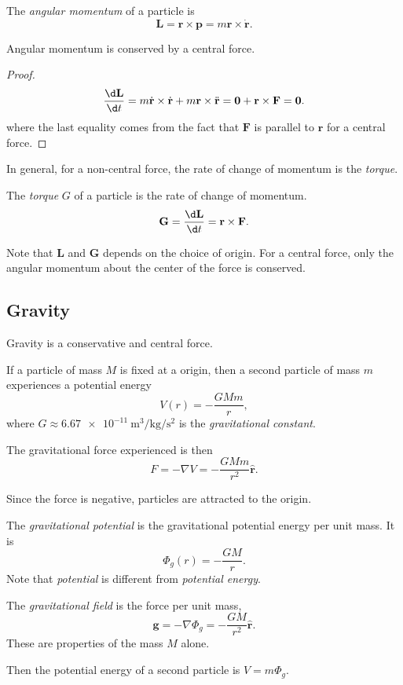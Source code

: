 \documentclass[a4paper]{article}
\begin{document}
\begin{defi}
  The \emph{angular momentum} of a particle is
  \[
    \mathbf{L} = \mathbf{r}\times \mathbf{p} = m\mathbf{r}\times \dot{\mathbf{r}}.
  \]
\end{defi}

\begin{prop}
  Angular momentum is conserved by a central force.
\end{prop}

\begin{proof}
  \[
    \frac{\d \mathbf{L}}{\d t} = m\dot{\mathbf{r}} \times \dot{\mathbf{r}} + m\mathbf{r}\times \ddot{\mathbf{r}} = \mathbf{0} + \mathbf{r}\times \mathbf{F} = \mathbf{0}.
  \]
  where the last equality comes from the fact that $\mathbf{F}$ is parallel to $\mathbf{r}$ for a central force.
\end{proof}
In general, for a non-central force, the rate of change of momentum is the \emph{torque}.
\begin{defi}[Torque]
  The \emph{torque} $G$ of a particle is the rate of change of momentum.
  \[
    \mathbf{G} = \frac{\d \mathbf{L}}{\d t} = \mathbf{r}\times \mathbf{F}.
  \]
\end{defi}

Note that $\mathbf{L}$ and $\mathbf{G}$ depends on the choice of origin. For a central force, only the angular momentum about the center of the force is conserved.

\subsection{Gravity}
Gravity is a conservative and central force.
\begin{law}
  If a particle of mass $M$ is fixed at a origin, then a second particle of mass $m$ experiences a potential energy
  \[
    V(r) = -\frac{GMm}{r},
  \]
  where $G \approx \SI{6.67e-11}{\meter\cubed\per\kilogram\per\second\squared}$ is the \emph{gravitational constant}.
  
  The gravitational force experienced is then
  \[
    F = -\nabla V = -\frac{GMm}{r^2}\hat{\mathbf{r}}.
  \]
\end{law}
Since the force is negative, particles are attracted to the origin.

\begin{defi}
  The \emph{gravitational potential} is the gravitational potential energy per unit mass. It is
  \[
    \Phi_g(r) = -\frac{GM}{r}.
  \]
  Note that \emph{potential} is different from \emph{potential energy}.

  The \emph{gravitational field} is the force per unit mass,
  \[
    \mathbf{g} = -\nabla \Phi_g = -\frac{GM}{r^2}\hat{\mathbf{r}}.
  \]
  These are properties of the mass $M$ alone.

  Then the potential energy of a second particle is $V = m\Phi_g$.
\end{defi}
\end{document}

